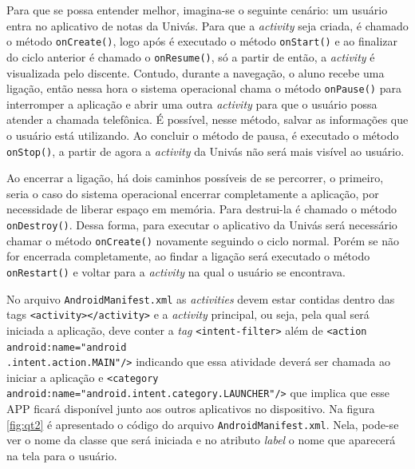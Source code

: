 	\par Para que se possa entender melhor, imagina-se o seguinte cenário: um
usuário entra no aplicativo de notas da Univás. Para que a \textit{activity}
seja criada, é chamado o método \texttt{onCreate()}, logo após é executado o
método \texttt{onStart()} e ao finalizar do ciclo anterior é chamado o
\texttt{onResume()}, só a partir de então, a \textit{activity} é visualizada
pelo discente. Contudo, durante a navegação, o aluno recebe uma ligação, então
nessa hora o sistema operacional chama o método \texttt{onPause()} para
interromper a aplicação e abrir uma outra \textit{activity} para que o usuário
possa atender a chamada telefônica. É possível, nesse método, salvar as
informações que o usuário está utilizando. Ao concluir o método de pausa, é
executado o método \texttt{onStop()}, a partir de agora a \textit{activity} da
Univás não será mais visível ao usuário.

 	\par Ao encerrar a ligação, há dois caminhos possíveis de se percorrer, o
primeiro, seria o caso do sistema operacional encerrar completamente a
aplicação, por necessidade de liberar espaço em memória. Para destrui-la é
chamado o método \texttt{onDestroy()}. Dessa forma, para executar o aplicativo
da Univás será necessário chamar o método \texttt{onCreate()} novamente
seguindo o ciclo normal. Porém se não for encerrada completamente, ao findar a
ligação será executado o método \texttt{onRestart()} e voltar para a
\textit{activity} na qual o usuário se encontrava.

	\par No arquivo \texttt{AndroidManifest.xml} as \textit{activities} devem
estar contidas dentro das tags \texttt{<activity></activity>} e a
\textit{activity} principal, ou seja, pela qual será iniciada a aplicação, deve
conter a \textit{tag} \texttt{<intent-filter>} além de \texttt{<action
android:name="android\\.intent.action.MAIN"/>} indicando que essa atividade
deverá ser chamada ao iniciar a aplicação e \texttt{<category
android:name="android.intent.category.LAUNCHER"/>} que implica que esse APP
ficará disponível junto aos outros aplicativos no dispositivo. Na figura
\ref{fig:qt2} é apresentado o código do arquivo \texttt{AndroidManifest.xml}.
Nela, pode-se ver o nome da classe que será iniciada e no atributo
\textit{label} o nome que aparecerá na tela para o usuário.
	
